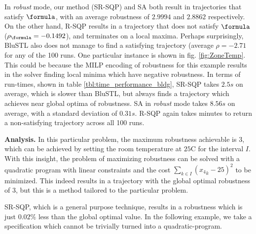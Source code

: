 In \textit{robust} mode, our method (SR-SQP) and SA both result in trajectories that satisfy $\formula$, with an average robustness of $2.9994$ and $2.8862$ respectively. On the other hand, R-SQP results in a trajectory that does not satisfy $\formula$ ($\rob_{\formula} = -0.1492$), and terminates on a local maxima. Perhaps surprisingly, BluSTL also does not manage to find a satisfying trajectory (average $\rho=-2.71$ for any of the 100 runs. One particular instance is shown in fig. \ref{fig:ZoneTemp}. This could be because the MILP encoding of robustness for this example results in the solver finding local minima which have negative robustness. In terms of run-times, shown in table \ref{tbl:time_performance_bldg}, SR-SQP takes $2.5s$ on average, which is slower than BluSTL, but always finds a trajectory which achieves near global optima of robustness. SA in \textit{robust} mode takes $8.56s$ on average, with a standard deviation of $0.31s$. R-SQP again takes minutes to return a non-satisfying trajectory across all 100 runs. 


\textbf{Analysis.} In this particular problem, the maximum robustness achievable is $3$, which can be achieved by setting the room temperature at $25$C for the interval $I$. 
With this insight, the problem of maximizing robustness can be solved with a quadratic program with linear constraints and the cost $\sum_{k \in I}({x_4}_k-25)^2$ to be minimized. This indeed results in a trajectory with the global optimal robustness of $3$, but this is a method tailored to the particular problem. 

SR-SQP, which is a general purpose technique, results in a robustness which is just $0.02\%$ less than the global optimal value. In the following example, we take a specification which cannot be trivially turned into a quadratic-program.

